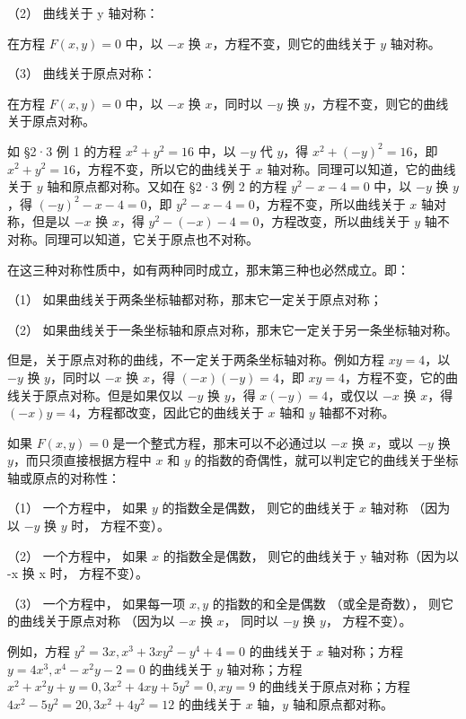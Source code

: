 （2） 曲线关于 y 轴对称：

在方程 \(F(x, y) = 0\) 中，以 \(-x\) 换 \(x\)，方程不变，则它的曲线关于
\(y\) 轴对称。

（3） 曲线关于原点对称：

在方程 \(F(x, y) = 0\) 中，以 \(-x\) 换 \(x\)，同时以 \(-y\) 换
\(y\)，方程不变，则它的曲线关于原点对称。

如 §2·3 例 1 的方程 \(x^{2} + y^{2} = 16\) 中，以 \(-y\) 代 \(y\)，得
\(x^{2} + (-y)^{2} = 16\)，即
\(x^{2} + y^{2} = 16\)，方程不变，所以它的曲线关于 \(x\)
轴对称。同理可以知道，它的曲线关于 \(y\) 轴和原点都对称。又如在 §2·3 例
2 的方程 \(y^{2} - x - 4 = 0\) 中，以 \(-y\) 换 \(y\)，得
\((-y)^{2} - x - 4 = 0\)，即
\(y^{2} - x - 4 = 0\)，方程不变，所以曲线关于 \(x\) 轴对称，但是以
\(-x\) 换 \(x\)，得 \(y^{2} - (-x) - 4 = 0\)，方程改变，所以曲线关于
\(y\) 轴不对称。同理可以知道，它关于原点也不对称。

在这三种对称性质中，如有两种同时成立，那末第三种也必然成立。即：

（1） 如果曲线关于两条坐标轴都对称，那末它一定关于原点对称；

（2） 如果曲线关于一条坐标轴和原点对称，那末它一定关于另一条坐标轴对称。

但是，关于原点对称的曲线，不一定关于两条坐标轴对称。例如方程
\(xy = 4\)，以 \(-y\) 换 \(y\)，同时以 \(-x\) 换 \(x\)，得
\((-x)(-y) = 4\)，即
\(xy = 4\)，方程不变，它的曲线关于原点对称。但是如果仅以 \(-y\) 换
\(y\)，得 \(x(-y) = 4\)，或仅以 \(-x\) 换 \(x\)，得
\((-x)y = 4\)，方程都改变，因此它的曲线关于 \(x\) 轴和 \(y\)
轴都不对称。

如果 \(F(x, y) = 0\) 是一个整式方程，那末可以不必通过以 \(-x\) 换
\(x\)，或以 \(-y\) 换 \(y\)，而只须直接根据方程中 \(x\) 和 \(y\)
的指数的奇偶性，就可以判定它的曲线关于坐标轴或原点的对称性：

（1） 一个方程中， 如果 \(y\) 的指数全是偶数， 则它的曲线关于 \(x\)
轴对称 （因为以 \(-y\) 换 \(y\) 时， 方程不变）。

（2） 一个方程中， 如果 \(x\) 的指数全是偶数， 则它的曲线关于 y
轴对称（因为以 -x 换 x 时， 方程不变）。

（3） 一个方程中， 如果每一项 \(x, y\) 的指数的和全是偶数
（或全是奇数）， 则它的曲线关于原点对称 （因为以 \(-x\) 换 \(x\)，
同时以 \(-y\) 换 \(y\)， 方程不变）。

例如，方程 \(y^{2} = 3x, x^{3} + 3xy^{2} - y^{4} + 4 = 0\) 的曲线关于
\(x\) 轴对称；方程 \(y = 4x^{3}, x^{4} - x^{2}y - 2 = 0\) 的曲线关于
\(y\) 轴对称；方程
\(x^{2} + x^{2}y + y = 0, 3x^{2} + 4xy + 5y^{2} = 0, xy = 9\)
的曲线关于原点对称；方程 \(4x^{2} - 5y^{2} = 20, 3x^{2} + 4y^{2} = 12\)
的曲线关于 \(x\) 轴，\(y\) 轴和原点都对称。

